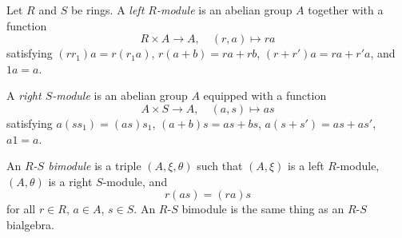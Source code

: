 Let $R$ and $S$ be rings. A \textit{left $R$-module} is an abelian group $A$ together with a function
$$R \times A \rightarrow A, \quad (r, a) \longmapsto ra$$
satisfying $(rr_1)a = r(r_1a)$, $r(a + b) = ra + rb$, $(r + r')a = ra + r'a$, and $1a = a$.

A \textit{right $S$-module} is an abelian group $A$ equipped with a function
$$A \times S \rightarrow A, \quad (a, s) \longmapsto as$$
satisfying $a(ss_1) = (as)s_1$, $(a + b)s = as + bs$, $a(s + s') = as + as'$, $a1 = a$.

An \textit{$R$-$S$ bimodule} is a triple $(A, \xi, \theta)$ such that $(A, \xi)$ is a left $R$-module, $(A, \theta)$ is a right $S$-module, and
$$r(as) = (ra)s$$
for all $r \in R$, $a \in A$, $s \in S$. An $R$-$S$ bimodule is the same thing as an $R$-$S$ bialgebra.
